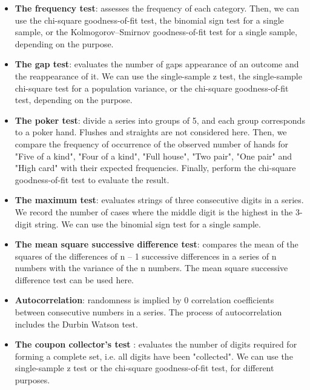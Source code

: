 \documentclass[12pt]{article}
\theoremstyle{plain}
\theoremstyle{definition}
\theoremstyle{remark}
\begin{document}
\begin{itemize}
    \item \textbf{The frequency test}\cite{3.4}: assesses the frequency of each category. Then, we can use the chi-square goodness-of-fit test, the binomial sign test for a single sample, or the Kolmogorov–Smirnov goodness-of-fit test for a single sample, depending on the purpose.\cite{3.4}
    \item \textbf{The gap test}\cite{3.10}\cite{3.11}\cite{3.12}\cite{3.13}\cite{3.14}\cite{3.15}\cite{3.16}: evaluates the number of gaps appearance of an outcome and the reappearance of it. We can use the single-sample z test, the single-sample chi-square test for a population variance, or the chi-square goodness-of-fit test, depending on the purpose.\cite{3.4}
    \item \textbf{The poker test}\cite{3.10}\cite{3.11}\cite{3.12}\cite{3.13}\cite{3.14}\cite{3.15}\cite{3.16}: divide a series into groups of 5, and each group corresponds to a poker hand. Flushes and straights are not considered here. Then, we compare the frequency of occurrence of the observed number of hands for "Five of a kind", "Four of a kind", "Full house", "Two pair", "One pair" and "High card" with their expected frequencies. Finally, perform the chi-square goodness-of-fit test to evaluate the result.\cite{3.4}
    \item \textbf{The maximum test}\cite{3.11}: evaluates strings of three consecutive digits in a series. We record the number of cases where the middle digit is the highest in the 3-digit string. We can use the binomial sign test for a single sample.\cite{3.4}
    \item \textbf{The mean square successive difference test}\cite{3.17}\cite{3.18}\cite{3.19}\cite{3.20}\cite{3.9}: compares the mean of the squares of the differences of n – 1 successive differences in a series of n numbers with the variance of the n numbers. The mean square successive difference test can be used here.\cite{3.4}
    \item \textbf{Autocorrelation}\cite{3.4}: randomness is implied by 0 correlation coefficients between consecutive numbers in a series. The process of autocorrelation includes the Durbin Watson test. \cite{3.20}\cite{3.21}\cite{3.22}\cite{3.23}\cite{3.24}\cite{3.25}
    \item \textbf{The coupon collector's test} \cite{3.4}: evaluates the number of digits required for forming a complete set, i.e. all digits have been "collected". We can use the single-sample z test or the chi-square goodness-of-fit test, for different purposes.\cite{3.4}

\end{itemize}
\end{document}

